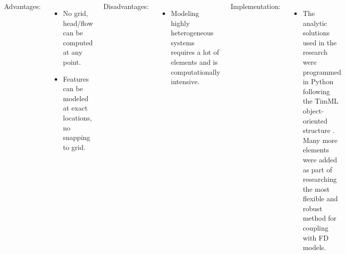 \documentclass[17pt, a0paper, portrait, margin=0mm, innermargin=5mm, blockverticalspace=7mm, colspace=6.5mm, subcolspace=6.5mm]{tikzposter}
\begin{document}
\begin{columns}
{        \vspace{3mm}
        
        Advantages:
        \begin{itemize}[noitemsep]
            \item No grid, head/flow can be computed at any point.
            \item Features can be modeled at exact locations, no snapping to grid.
        \end{itemize}
        
        \vspace{3mm}
        
        Disadvantages:
        \begin{itemize}[noitemsep]
            \item Modeling highly heterogeneous systems requires a lot of elements and is computationally intensive.
        \end{itemize}   

        \vspace{3mm}
        
        Implementation:
        \begin{itemize}[noitemsep]
            \item The analytic solutions used in the research were programmed in Python following the TimML object-oriented structure \citep{bakker_writing_2009,mark_bakker_analytical_2022}. Many more elements were added as part of researching the most flexible and robust method for coupling with FD models.
        \end{itemize}
}

\end{columns}
\end{document}
